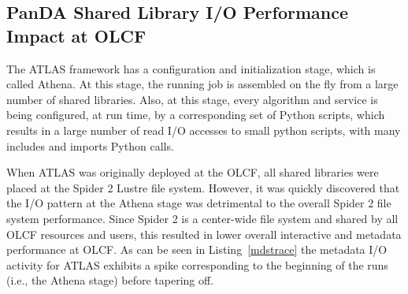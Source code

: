 \subsection{PanDA Shared Library I/O Performance Impact at OLCF}

The ATLAS framework has a configuration and initialization stage, which is
called Athena. At this stage, the running job is assembled  on the fly from a
large number of shared libraries.  Also, at this stage, every algorithm and
service is being configured, at run time, by a corresponding set of Python
scripts, which results in a large number of read I/O accesses to small python
scripts, with many includes and imports Python calls.

When ATLAS was originally deployed at the OLCF, all shared libraries were
placed at the Spider 2 Lustre file system. However, it was quickly discovered
that the I/O pattern at the Athena stage was detrimental to the overall Spider
2 file system performance. Since Spider 2 is a center-wide file system and
shared by all OLCF resources and users, this resulted in lower overall
interactive and metadata performance at OLCF\@. As can be seen in
Listing~\ref{mdstrace} the metadata I/O activity for ATLAS exhibits a spike
corresponding to the beginning of the runs (i.e., the Athena stage) before
tapering off.

